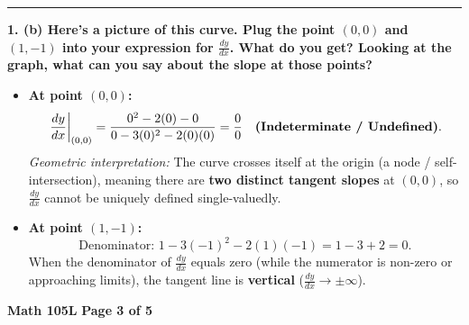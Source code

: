 \documentclass[10.5pt]{article}
\begin{document}
\vspace{0.06in}
\rule{\textwidth}{0.6pt}
\vspace{0.04in}

\textbf{1. (b) Here's a picture of this curve. Plug the point $(0,0)$ and $(1,-1)$ into your expression for $\frac{dy}{dx}$. What do you get? Looking at the graph, what can you say about the slope at those points?}

\begin{minipage}[c]{0.52\textwidth}
  \begin{itemize}[leftmargin=1.2em, topsep=1pt, itemsep=3pt]
    \item \textbf{At point $(0,0)$:}
    \[
      \left.\frac{dy}{dx}\right|_{(0,0)} = \frac{0^2 - 2(0) - 0}{0 - 3(0)^2 - 2(0)(0)} = \frac{0}{0} \quad \text{\textbf{(Indeterminate / Undefined)}}.
    \]
    \textit{Geometric interpretation:} The curve crosses itself at the origin (a node / self-intersection), meaning there are \textbf{two distinct tangent slopes} at $(0,0)$, so $\frac{dy}{dx}$ cannot be uniquely defined single-valuedly.
    
    \item \textbf{At point $(1,-1)$:}
    \[
      \text{Denominator: } 1 - 3(-1)^2 - 2(1)(-1) = 1 - 3 + 2 = 0.
    \]
    When the denominator of $\frac{dy}{dx}$ equals zero (while the numerator is non-zero or approaching limits), the tangent line is \textbf{vertical} ($\frac{dy}{dx} \to \pm\infty$).
  \end{itemize}
\end{minipage}
\hfill
\begin{minipage}[c]{0.45\textwidth}
  \centering
\end{minipage}

\vfill
\noindent \textbf{\small Math 105L} \hfill \textbf{\small Page 3 of 5}
\end{document}
